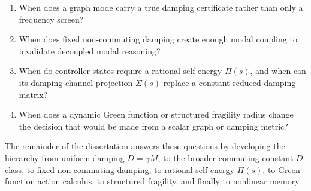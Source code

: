 \begin{enumerate}
\item When does a graph mode carry a true damping certificate rather than only
a frequency screen?
\item When does fixed non-commuting damping create enough modal coupling to
invalidate decoupled modal reasoning?
\item When do controller states require a rational self-energy \(\Pi(s)\),
and when can its damping-channel projection \(\Sigma(s)\) replace a constant
reduced damping matrix?
\item When does a dynamic Green function or structured fragility radius change
the decision that would be made from a scalar graph or damping metric?
\end{enumerate}

The remainder of the dissertation answers these questions by developing the
hierarchy from uniform damping \(D=\gamma M\), to the broader commuting
constant-\(D\) class, to fixed non-commuting damping, to rational
self-energy \(\Pi(s)\), to Green-function action calculus, to structured
fragility, and finally to nonlinear memory.
